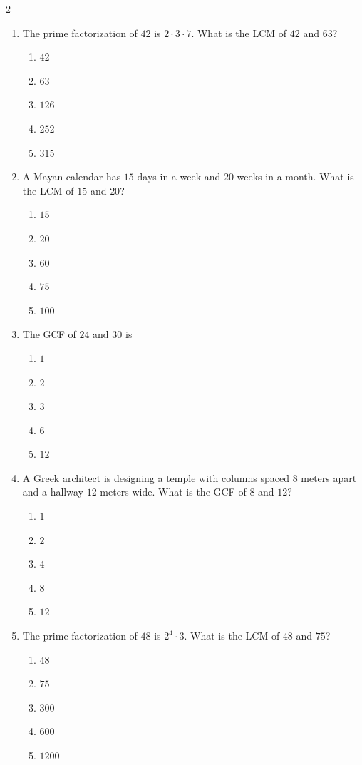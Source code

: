 \documentclass[10pt]{article}
\begin{document}
\begin{multicols}{2}
\begin{enumerate}[label=\textbf{Q\arabic*.}, leftmargin=*, itemsep=6pt, parsep=0pt]
  \item \small The prime factorization of $42$ is $2 \cdot 3 \cdot 7$. What is the LCM of $42$ and $63$?
  \begin{enumerate}[label=(\Alph*), leftmargin=0.6cm, nosep, itemsep=2pt]
    \item $42$
    \item $63$
    \item $126$
    \item $252$
    \item $315$
  \end{enumerate}

  \item \small A Mayan calendar has $15$ days in a week and $20$ weeks in a month. What is the LCM of $15$ and $20$?
  \begin{enumerate}[label=(\Alph*), leftmargin=0.6cm, nosep, itemsep=2pt]
    \item $15$
    \item $20$
    \item $60$
    \item $75$
    \item $100$
  \end{enumerate}

  \item \small The GCF of $24$ and $30$ is
  \begin{enumerate}[label=(\Alph*), leftmargin=0.6cm, nosep, itemsep=2pt]
    \item $1$
    \item $2$
    \item $3$
    \item $6$
    \item $12$
  \end{enumerate}

  \item \small A Greek architect is designing a temple with columns spaced $8$ meters apart and a hallway $12$ meters wide. What is the GCF of $8$ and $12$?
  \begin{enumerate}[label=(\Alph*), leftmargin=0.6cm, nosep, itemsep=2pt]
    \item $1$
    \item $2$
    \item $4$
    \item $8$
    \item $12$
  \end{enumerate}

  \item \small The prime factorization of $48$ is $2^4 \cdot 3$. What is the LCM of $48$ and $75$?
  \begin{enumerate}[label=(\Alph*), leftmargin=0.6cm, nosep, itemsep=2pt]
    \item $48$
    \item $75$
    \item $300$
    \item $600$
    \item $1200$
  \end{enumerate}


\end{enumerate}
\end{multicols}
\end{document}
